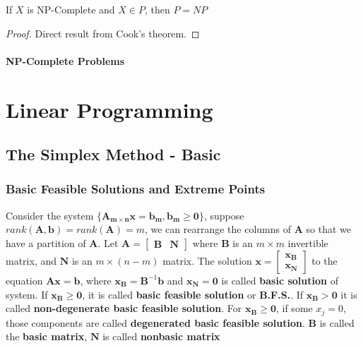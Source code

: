 					\begin{theorem}
						If $X$ is NP-Complete and $X \in P$, then $P = NP$
					\end{theorem}

					\begin{proof}
						Direct result from Cook's theorem.
					\end{proof}

				\subsection{NP-Complete Problems}

	\part{Linear Programming}\label{LP}
		\chapter{The Simplex Method - Basic}
			\section{Basic Feasible Solutions and Extreme Points}
				\begin{definition}
					Consider the system $\{\mathbf{A_{m\times n}x} = \mathbf{b_m}, \mathbf{b_m}\ge \mathbf{0}\}$, suppose $rank(\mathbf{A}, \mathbf{b}) = rank(\mathbf{A}) = m$, we can rearrange the columns of $\mathbf{A}$ so that we have a partition of $\mathbf{A}$. Let $\mathbf{A} = \left[\begin{matrix}\mathbf{B} & \mathbf{N}\end{matrix}\right]$ where $\mathbf{B}$ is an $m\times m$ invertible matrix, and $\mathbf{N}$ is an $m\times (n-m)$ matrix. The solution $\mathbf{x}=\left[\begin{matrix}\mathbf{x_B}\\\mathbf{x_N}\end{matrix}\right]$ to the equation $\mathbf{Ax} = \mathbf{b}$, where $\mathbf{x_B} = \mathbf{B}^{-1} \mathbf{b}$ and $\mathbf{x_N} = \mathbf{0}$ is called \textbf{basic solution} of system. If $\mathbf{x_B} \ge \mathbf{0}$, it is called \textbf{basic feasible solution} or \textbf{B.F.S.}. If $\mathbf{x_B} > \mathbf{0}$ it is called \textbf{non-degenerate basic feasible solution}. For $\mathbf{x_B} \ge \mathbf{0}$, if some $x_j = 0$, those components are called \textbf{degenerated basic feasible solution}. $\mathbf{B}$ is called the \textbf{basic matrix}, $\mathbf{N}$ is called \textbf{nonbasic matrix}
				\end{definition}

